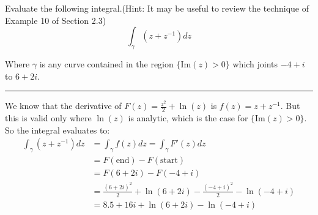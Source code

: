 \begin{example}

    Evaluate the following integral.(Hint: It may be useful to review the technique of Example 10 of Section 2.3)
    $$\int_\gamma(z+z^{-1})dz$$


    Where $\gamma$ is any curve contained in the region $\{$Im$( z) > 0\}$ which joints $-4+i$ to $6+2i.$

    \hrule
    \vspace{0.5cm}

    We know that the derivative of $F(z) = \frac{z^2}{2} + \ln(z)$ is $f(z) = z + z^{-1}$. But this is valid only where $\ln(z)$ is analytic, which is the case for $\{$Im$( z) > 0\}$. So the integral evaluates to:
    \begin{align*}
        \int_\gamma(z+z^{-1})dz & = \int_\gamma f(z)dz = \int_\gamma F'(z)dz                        \\
                                & = F(\text{end}) - F(\text{start})                                 \\
                                & = F(6+2i) - F(-4+i)                                               \\
                                & = \frac{(6+2i)^2}{2} + \ln(6+2i) - \frac{(-4+i)^2}{2} - \ln(-4+i) \\
                                & = 8.5 + 16i + \ln(6 + 2i) - \ln(-4 + i)
    \end{align*}
\end{example}

